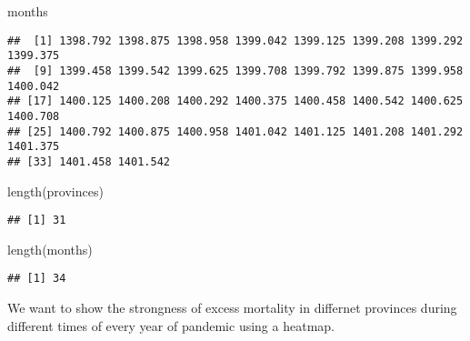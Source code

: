\documentclass[
]{article}
\newenvironment{Shaded}{\begin{snugshade}}{\end{snugshade}}
\newcommand{\FunctionTok}[1]{\textcolor[rgb]{0.00,0.00,0.00}{#1}}
\newcommand{\NormalTok}[1]{#1}
\begin{document}
\begin{Shaded}
\begin{Highlighting}[]
\NormalTok{months}
\end{Highlighting}
\end{Shaded}

\begin{verbatim}
##  [1] 1398.792 1398.875 1398.958 1399.042 1399.125 1399.208 1399.292 1399.375
##  [9] 1399.458 1399.542 1399.625 1399.708 1399.792 1399.875 1399.958 1400.042
## [17] 1400.125 1400.208 1400.292 1400.375 1400.458 1400.542 1400.625 1400.708
## [25] 1400.792 1400.875 1400.958 1401.042 1401.125 1401.208 1401.292 1401.375
## [33] 1401.458 1401.542
\end{verbatim}

\begin{Shaded}
\begin{Highlighting}[]
\FunctionTok{length}\NormalTok{(provinces)}
\end{Highlighting}
\end{Shaded}

\begin{verbatim}
## [1] 31
\end{verbatim}

\begin{Shaded}
\begin{Highlighting}[]
\FunctionTok{length}\NormalTok{(months)}
\end{Highlighting}
\end{Shaded}

\begin{verbatim}
## [1] 34
\end{verbatim}

We want to show the strongness of excess mortality in differnet
provinces during different times of every year of pandemic using a
heatmap.
\end{document}
